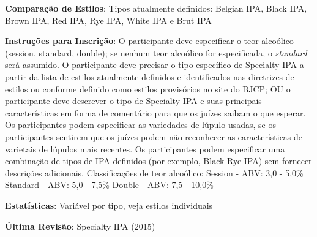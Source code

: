 \textbf{Comparação de Estilos}: Tipos atualmente definidos: Belgian IPA, Black IPA, Brown IPA, Red IPA, Rye IPA, White IPA e Brut IPA

\textbf{Instruções para Inscrição}: O participante deve especificar o teor alcoólico (session, standard, double); se nenhum teor alcoólico for especificada, o \textit{standard} será assumido. O participante deve precisar o tipo específico de Specialty IPA a partir da lista de estilos atualmente definidos e identificados nas diretrizes de estilos ou conforme definido como estilos provisórios no site do BJCP; OU o participante deve descrever o tipo de Specialty IPA e suas principais características em forma de comentário para que os juízes saibam o que esperar. Os participantes podem especificar as variedades de lúpulo usadas, se os participantes sentirem que os juízes podem não reconhecer as características de varietais de lúpulos mais recentes. Os participantes podem especificar uma combinação de tipos de IPA definidos (por exemplo, Black Rye IPA) sem fornecer descrições adicionais. Classificações de teor alcoólico: Session - ABV: 3,0 - 5,0\% Standard - ABV: 5,0 - 7,5\% Double - ABV: 7,5 - 10,0\%

\textbf{Estatísticas}: Variável por tipo, veja estilos individuais

\textbf{Última Revisão}: Specialty IPA (2015)

